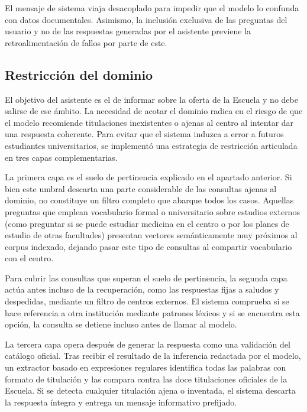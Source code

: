 


El mensaje de sistema viaja desacoplado para impedir que el modelo lo confunda con datos documentales. Asimismo, la inclusión exclusiva de las preguntas del usuario y no de las respuestas generadas por el asistente previene la retroalimentación de fallos por parte de este.

\subsection[Restricción del dominio]{Restricción del dominio}
\label{secc:fase2_dominio}

El objetivo del asistente es el de informar sobre la oferta de la Escuela y no debe salirse de ese ámbito. La necesidad de acotar el dominio radica en el riesgo de que el modelo recomiende titulaciones inexistentes o ajenas al centro al intentar dar una respuesta coherente. Para evitar que el sistema induzca a error a futuros estudiantes universitarios, se implementó una estrategia de restricción articulada en tres capas complementarias.

La primera capa es el suelo de pertinencia explicado en el apartado anterior. Si bien este umbral descarta una parte considerable de las consultas ajenas al dominio, no constituye un filtro completo que abarque todos los casos. Aquellas preguntas que emplean vocabulario formal o universitario sobre estudios externos (como preguntar si se puede estudiar medicina en el centro o por los planes de estudio de otras facultades) presentan vectores semánticamente muy próximos al corpus indexado, dejando pasar este tipo de consultas al compartir vocabulario con el centro.

Para cubrir las consultas que superan el suelo de pertinencia, la segunda capa actúa antes incluso de la recuperación, como las respuestas fijas a saludos y despedidas, mediante un filtro de centros externos. El sistema comprueba si se hace referencia a otra institución mediante patrones léxicos y si se encuentra esta opción, la consulta se detiene incluso antes de llamar al modelo.


La tercera capa opera después de generar la respuesta como una validación del catálogo oficial. Tras recibir el resultado de la inferencia redactada por el modelo, un extractor basado en expresiones regulares identifica todas las palabras con formato de titulación y las compara contra las doce titulaciones oficiales de la Escuela. Si se detecta cualquier titulación ajena o inventada, el sistema descarta la respuesta íntegra y entrega un mensaje informativo prefijado.

